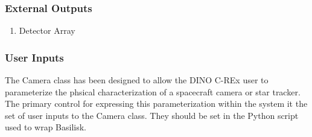 \documentclass[]{DINOReportMemo}
\begin{document}
\subsubsection{External Outputs}
\begin{enumerate}
    \item Detector Array
\end{enumerate}
\subsubsection{User Inputs}
The Camera class has been designed to allow the DINO C-REx user to parameterize the phsical characterization of a spacecraft camera or star tracker. The primary control for expressing this parameterization within the system it the set of user inputs to the Camera class. They should be set in the Python script used to wrap Basilisk.
\end{document}
